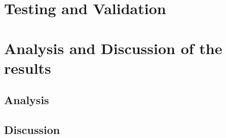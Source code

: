 \section{Testing and Validation}%

\section{Analysis and Discussion of the results}%


\subsection{Analysis}
\subsection{Discussion}%